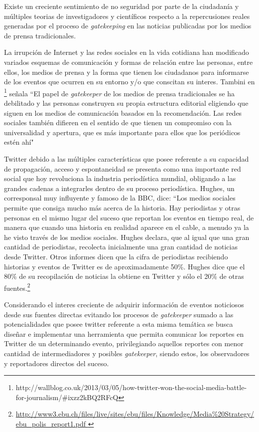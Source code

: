 Existe un creciente sentimiento de no seguridad por parte de la ciudadanía y múltiples teorias de investigadores y científicos respecto a la repercusiones reales generadas por el proceso de \emph{gatekeeping} en las noticias publicadas
por los medios de prensa tradicionales.

La irrupción de Internet y las redes sociales en la vida cotidiana han modificado variados esquemas de comunicación y formas de relación
entre las personas, entre ellos, los medios de prensa y la forma que tienen los ciudadanos para informarse de los eventos que ocurren en su entorno y/o que conscitan su interes. Tambini en  \footnote{http://wallblog.co.uk/2013/03/05/how-twitter-won-the-social-media-battle-for-journalism/\#ixzz2kBQ2RFcQ } señala ``El papel de \emph{gatekeeper} de los medios de prensa tradicionales se ha debilitado y las personas construyen su propia estructura editorial eligiendo que siguen en los medios de comunicación basados en la recomendación. Las redes sociales también difieren en el sentido de que tienen un compromiso con la universalidad y apertura, que es más importante para ellos que los periódicos estén ahí" 

Twitter debido a las múltiples características que posee referente a su capacidad de propagación, acceso y espontaneidad se presenta como una importante red social que hoy revoluciona la industria periodística mundial, obligando a las grandes cadenas a integrarles dentro de su proceso periodística. Hughes, un corresponsal muy influyente y famoso de la BBC, dice: ``Los medios sociales permite que consiga mucho más acerca de la historia. Hay periodistas y otras personas en el mismo lugar del suceso que reportan los eventos en tiempo real, de manera que cuando una historia en realidad aparece en el cable, a menudo ya la he visto través de los medios sociales. Hughes declara, que al igual que una gran cantidad de periodistas, recolecta inicialmente una gran cantidad de noticias desde Twitter. Otros informes dicen que la cifra de periodistas recibiendo historias y eventos de Twitter es de aproximadamente 50\%. Hughes dice que el 80\% de su recopilación de noticias la obtiene en Twitter y sólo el 20\% de otras fuentes.\footnote{\url{http://www3.ebu.ch/files/live/sites/ebu/files/Knowledge/Media\%20Strategy/ebu_polis_report1.pdf }}

Considerando el interes creciente de adquirir información de eventos noticiosos desde sus fuentes directas evitando los procesos de \emph{gatekeeper} sumado a las potencialidades que posee twitter referente a esta misma temática se busca diseñar e implementar una herramienta que permita comunicar los reportes en Twitter de un determinando evento, privilegiando aquellos reportes con menor cantidad de intermediadores y posibles \emph{gatekeeper}, siendo estos, los observadores y reportadores directos del suceso.

